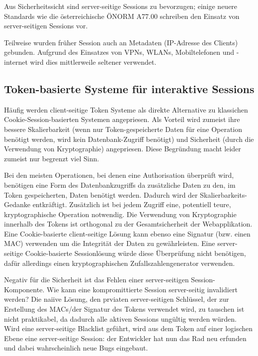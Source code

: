 Aus Sicherheitssicht sind server-seitige Sessions zu bevorzugen; einige neuere Standards wie die österreichische ÖNORM A77.00 schreiben den Einsatz von server-seitigen Sessions vor.

Teilweise wurden früher Session auch an Metadaten (IP-Adresse des Clients) gebunden. Aufgrund des Einsatzes von VPNs, WLANs, Mobiltelefonen und -internet wird dies mittlerweile seltener verwendet.

\subsection{Token-basierte Systeme für interaktive Sessions}

Häufig werden client-seitige Token Systeme als direkte Alternative zu klassichen Cookie-Session-basierten Systemen angepriesen. Als Vorteil wird zumeist ihre bessere Skalierbarkeit (wenn nur Token-gespeicherte Daten für eine Operation benötigt werden, wird kein Datenbank-Zugriff benötigt) und Sicherheit (durch die Verwendung von Kryptographie) angepriesen. Diese Begründung macht leider zumeist nur begrenzt viel Sinn.

Bei den meisten Operationen, bei denen eine Authorisation überprüft wird, benötigen eine Form des Datenbankzugriffs da zusätzliche Daten zu den, im Token gespeicherten, Daten benötigt werden. Dadurch wird der Skalierbarkeits-Gedanke entkräftigt. Zusätzlich ist bei jedem Zugriff eine, potentiell teure, kryptographische Operation notwendig. Die Verwendung von Kryptographie innerhalb des Tokens ist orthogonal zu der Gesamtsicherheit der Webapplikation. Eine Cookie-basierte client-seitige Lösung kann ebenso eine Signatur (bzw. einen MAC) verwenden um die Integrität der Daten zu gewährleisten. Eine server-seitige Cookie-basierte Sessionlösung würde diese Überprüfung nicht benötigen, dafür allerdings einen kryptographischen Zufallszahlengenerator verwenden.

Negativ für die Sicherheit ist das Fehlen einer server-seitigen Session-Komponente. Wie kann eine kompromittierte Session server-seitig invalidiert werden? Die naiive Lösung, den prviaten server-seitigen Schlüssel, der zur Erstellung des MACs/der Signatur des Tokens verwendet wird, zu tauschen ist nicht praktikabel, da dadurch alle aktiven Sessions ungültig werden würden. Wird eine server-seitige Blacklist geführt, wird aus dem Token auf einer logischen Ebene eine server-seitige Session: der Entwickler hat nun das Rad neu erfunden und dabei wahrscheinlich neue Bugs eingebaut.

